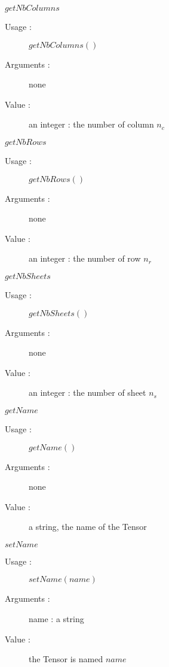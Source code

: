 \begin{description}
\begin{description}
  \item $getNbColumns$
    \begin{description}
    \item[Usage :] $getNbColumns()$
    \item[Arguments :] none
    \item[Value :] an integer : the number of column $n_c$
    \end{description}
    \bigskip

  \item $getNbRows$
    \begin{description}
    \item[Usage :] $getNbRows()$
    \item[Arguments :] none
    \item[Value :] an integer : the number of row $n_r$
    \end{description}
    \bigskip

  \item $getNbSheets$
    \begin{description}
    \item[Usage :] $getNbSheets()$
    \item[Arguments :] none
    \item[Value :] an integer : the number of sheet $n_s$
    \end{description}
    \bigskip

  \item $getName$
    \begin{description}
    \item[Usage :] $getName()$
    \item[Arguments :] none
    \item[Value :] a string, the name of the Tensor
    \end{description}
    \bigskip

  \item $setName$
    \begin{description}
    \item[Usage :] $setName(name)$
    \item[Arguments :] name : a string
    \item[Value :] the Tensor is named $name$
    \end{description}
    \bigskip

  \end{description}

\end{description}


